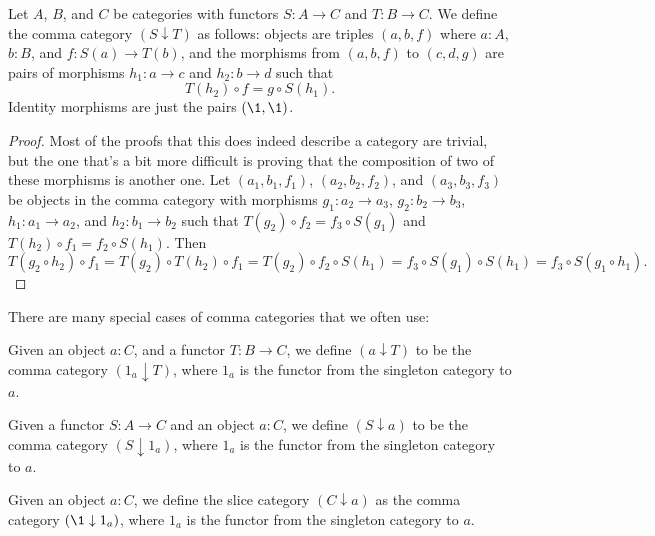 \documentclass[../../math.tex]{subfiles}
\begin{document}
\begin{theorem}
    Let $A$, $B$, and $C$ be categories with functors $S : A \to C$ and $T : B
    \to C$.  We define the comma category $(S \downarrow T)$ as follows: objects
    are triples $(a, b, f)$ where $a : A$, $b : B$, and $f : S(a) \to T(b)$, and
    the morphisms from $(a, b, f)$ to $(c, d, g)$ are pairs of morphisms $h_1 :
    a \to c$ and $h_2 : b \to d$ such that
    \[
        T(h_2) \circ f = g \circ S(h_1).
    \]
    Identity morphisms are just the pairs $(\1, \1)$.
\end{theorem}
\begin{proof}
    Most of the proofs that this does indeed describe a category are trivial,
    but the one that's a bit more difficult is proving that the composition of
    two of these morphisms is another one.  Let $(a_1, b_1, f_1)$, $(a_2, b_2,
    f_2)$, and $(a_3, b_3, f_3)$ be objects in the comma category with morphisms
    $g_1 : a_2 \to a_3$, $g_2 : b_2 \to b_3$, $h_1 : a_1 \to a_2$, and $h_2 :
    b_1 \to b_2$ such that $T(g_2) \circ f_2 = f_3 \circ S(g_1)$ and $T(h_2)
    \circ f_1 = f_2 \circ S(h_1)$.  Then
    \[
        T(g_2 \circ h_2) \circ f_1
        = T(g_2) \circ T(h_2) \circ f_1
        = T(g_2) \circ f_2 \circ S(h_1)
        = f_3 \circ S(g_1) \circ S(h_1)
        = f_3 \circ S(g_1 \circ h_1).
    \]
\end{proof}

There are many special cases of comma categories that we often use:

\begin{definition}
    Given an object $a : C$, and a functor $T : B \to C$, we define $(a
    \downarrow T)$ to be the comma category $(1_a \downarrow T)$, where $1_a$ is
    the functor from the singleton category to $a$.
\end{definition}

\begin{definition}
    Given a functor $S : A \to C$ and an object $a : C$, we define $(S
    \downarrow a)$ to be the comma category $(S \downarrow 1_a)$, where $1_a$ is
    the functor from the singleton category to $a$.
\end{definition}

\begin{definition}
    Given an object $a : C$, we define the slice category $(C \downarrow a)$ as
    the comma category $(\1 \downarrow 1_a)$, where $1_a$ is the functor from
    the singleton category to $a$.
\end{definition}
\end{document}
